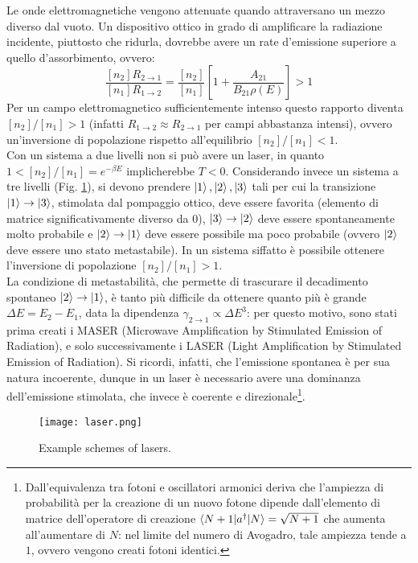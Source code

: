 Le onde elettromagnetiche vengono attenuate quando attraversano un mezzo diverso dal vuoto. Un dispositivo ottico in grado di amplificare la radiazione incidente, piuttosto che ridurla, dovrebbe avere un rate d'emissione superiore a quello d'assorbimento, ovvero:
\begin{equation*}
	\frac{[n_2] R_{2 \rightarrow 1}}{[n_1] R_{1 \rightarrow 2}} = \frac{[n_2]}{[n_1]} \left[ 1 + \frac{A_{21}}{B_{21} \rho(E)} \right] > 1
\end{equation*}
Per un campo elettromagnetico sufficientemente intenso questo rapporto diventa $ [n_2] / [n_1] > 1 $ (infatti $ R_{1 \rightarrow 2} \approx R_{2 \rightarrow 1} $ per campi abbastanza intensi), ovvero un'inversione di popolazione rispetto all'equilibrio $ [n_2] / [n_1] < 1 $. \\
Con un sistema a due livelli non si può avere un laser, in quanto $ 1 < [n_2] / [n_1] = e^{-\beta E} $ implicherebbe $ T < 0 $. Considerando invece un sistema a tre livelli (Fig. \ref{laser}), si devono prendere $ \ket{1},\ket{2},\ket{3} $ tali per cui la transizione $ \ket{1} \rightarrow \ket{3} $, stimolata dal pompaggio ottico, deve essere favorita (elemento di matrice significativamente diverso da 0), $ \ket{3} \rightarrow \ket{2} $ deve essere spontaneamente molto probabile e $ \ket{2} \rightarrow \ket{1} $ deve essere possibile ma poco probabile (ovvero $ \ket{2} $ deve essere uno stato metastabile). In un sistema siffatto è possibile ottenere l'inversione di popolazione $ [n_2] / [n_1] > 1 $. \\
La condizione di metastabilità, che permette di trascurare il decadimento spontaneo $ \ket{2} \rightarrow \ket{1} $, è tanto più difficile da ottenere quanto più è grande $ \Delta E = E_2 - E_1 $, data la dipendenza $ \gamma_{2 \rightarrow 1} \propto \Delta E^3 $: per questo motivo, sono stati prima creati i MASER (Microwave Amplification by Stimulated Emission of Radiation), e solo successivamente i LASER (Light Amplification by Stimulated Emission of Radiation). Si ricordi, infatti, che l'emissione spontanea è per sua natura incoerente, dunque in un laser è necessario avere una dominanza dell'emissione stimolata, che invece è coerente e direzionale\footnote{Dall'equivalenza tra fotoni e oscillatori armonici deriva che l'ampiezza di probabilità per la creazione di un nuovo fotone dipende dall'elemento di matrice dell'operatore di creazione $ \braket{N + 1 | a^\dagger | N} = \sqrt{N + 1} $ che aumenta all'aumentare di $ N $: nel limite del numero di Avogadro, tale ampiezza tende a $ 1 $, ovvero vengono creati fotoni identici.}.

\begin{figure}
	\centering
	\texttt{[image: laser.png]}
	\caption{Example schemes of lasers.}
	\label{laser}
\end{figure}










